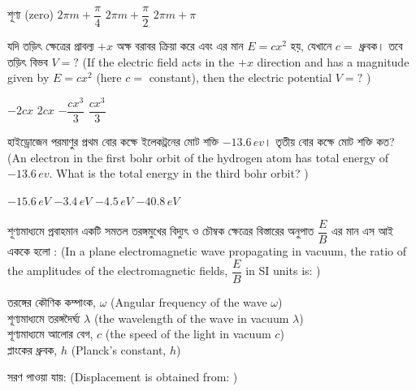 \documentclass[addpoints]{exam}
\begin{document}
\begin{questions}
\begin{oneparchoices}
\choice শূণ্য (zero)
\choice $ 2\pi m +\dfrac{\pi}{4}$
\choice $ 2\pi m +\dfrac{\pi}{2}$
\choice $ 2\pi m +\pi $
\end{oneparchoices}

\question  যদি তড়িৎ ক্ষেত্রের প্রাবল্য $ +x $ অক্ষ বরাবর ক্রিয়া করে এবং এর মান $ E=cx^{2} $ হয়, যেখানে $ c= $ ধ্রুবক। তবে তড়িৎ বিভব $ V=? $ (If the electric field acts in the $ +x $ direction and has a magnitude given by $ E=cx^{2} $ (here $ c= $ constant), then the electric potential  $ V=? $ ) 

\begin{oneparchoices}
\choice $ -2cx $
\choice $ 2cx $
\choice $ -\dfrac{cx^{3}}{3} $
\choice $ \dfrac{cx^{3}}{3} $

\end{oneparchoices}

\question  হাইড্রোজেন পরমাণুর প্রথম বোর কক্ষে ইলেকট্রনের মোট শক্তি $ -13.6\,ev $। তৃতীয় বোর কক্ষে মোট শক্তি কত? (An electron in the first bohr orbit of the hydrogen atom has total energy of $ -13.6\,ev $. What is the total energy in the third bohr orbit? )

\begin{oneparchoices}
\choice $ -15.6\,eV $
\choice $ -3.4\,eV $
\choice $ -4.5\,eV $
\choice $ -40.8\,eV $
\end{oneparchoices}

\question শূণ্যমাধ্যমে প্রবাহমান একটি সমতল তরঙ্গমুখের বিদ্যুৎ ও চৌম্বক ক্ষেত্রের বিস্তারের অনুপাত $ \dfrac{E}{B} $ এর মান এস আই এককে হলো : (In a plane electromagnetic wave propagating in vacuum, the ratio of the amplitudes of the electromagnetic fields, $ \dfrac{E}{B} $ in SI units is: )

\begin{oneparchoices}
\choice তরঙ্গের কৌণিক কম্পাংক, $ \omega $ (Angular frequency of the wave $ \omega $)\\
\hspace*{-.3cm}\choice শূণ্যমাধ্যমে তরঙ্গদৈর্ঘ্য $ \lambda $ (the wavelength of the wave in vacuum $ \lambda $)\\
\hspace*{-.3cm}\choice  শূণ্যমাধ্যমে আলোর বেগ, $ c $ (the speed of the light in vacuum $ c $)\\
\hspace*{-.3cm}\choice  প্লাংকের ধ্রুবক, $ h $ (Planck's constant, $ h $)
\end{oneparchoices}

\question  সরণ পাওয়া যায়: (Displacement is obtained from: )


\end{questions}
\end{document}
